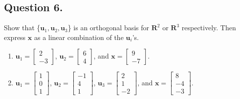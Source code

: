 \documentclass{article}
\begin{document}
\subsection*{Question 6.}
Show that \{$\mathbf{u}_1,\mathbf{u}_2,\mathbf{u}_3$\} is an orthogonal basis for $\mathbf{R}^2$ or $\mathbf{R}^3$ respectively. Then express $\mathbf{x}$ as a linear combination of the $\mathbf{u}_i$'s.
\begin{enumerate}[label=(\arabic*)]
    \item $\mathbf{u}_1=\left[\begin{array}{r}2\\-3\end{array}\right]$, $\mathbf{u}_2=\left[\begin{array}{r}6\\4\end{array}\right]$, and $\mathbf{x}=\left[\begin{array}{r}9\\-7\end{array}\right]$.
    \item $\mathbf{u}_1=\left[\begin{array}{r}1\\0\\1\end{array}\right]$, $\mathbf{u}_2=\left[\begin{array}{r}-1\\4\\1\end{array}\right]$, $\mathbf{u}_3=\left[\begin{array}{r}2\\1\\-2\end{array}\right]$, and $\mathbf{x}=\left[\begin{array}{r}8\\-4\\-3\end{array}\right]$.
    
\end{enumerate}
\end{document}
